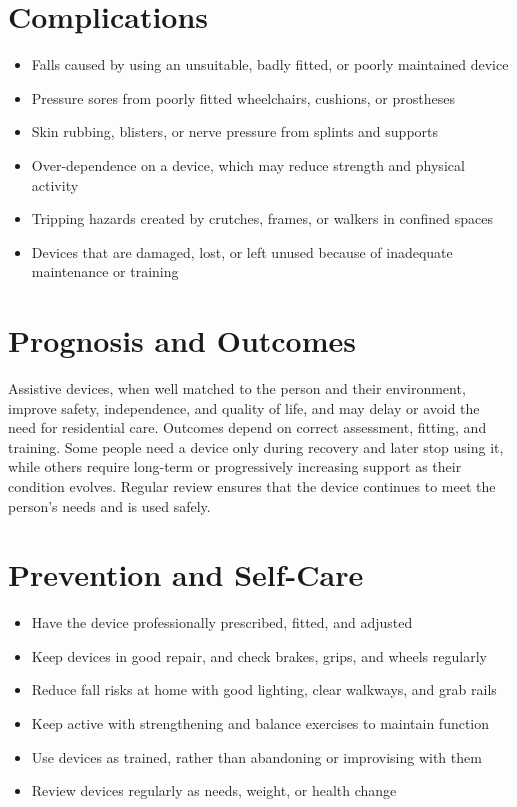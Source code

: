 \section*{Complications}
\begin{itemize}
    \item Falls caused by using an unsuitable, badly fitted, or poorly maintained device
    \item Pressure sores from poorly fitted wheelchairs, cushions, or prostheses
    \item Skin rubbing, blisters, or nerve pressure from splints and supports
    \item Over-dependence on a device, which may reduce strength and physical activity
    \item Tripping hazards created by crutches, frames, or walkers in confined spaces
    \item Devices that are damaged, lost, or left unused because of inadequate maintenance or training
\end{itemize}

\section*{Prognosis and Outcomes}
Assistive devices, when well matched to the person and their environment, improve safety, independence, and quality of life, and may delay or avoid the need for residential care. Outcomes depend on correct assessment, fitting, and training. Some people need a device only during recovery and later stop using it, while others require long-term or progressively increasing support as their condition evolves. Regular review ensures that the device continues to meet the person's needs and is used safely.

\section*{Prevention and Self-Care}
\begin{itemize}
    \item Have the device professionally prescribed, fitted, and adjusted
    \item Keep devices in good repair, and check brakes, grips, and wheels regularly
    \item Reduce fall risks at home with good lighting, clear walkways, and grab rails
    \item Keep active with strengthening and balance exercises to maintain function
    \item Use devices as trained, rather than abandoning or improvising with them
    \item Review devices regularly as needs, weight, or health change
\end{itemize}

